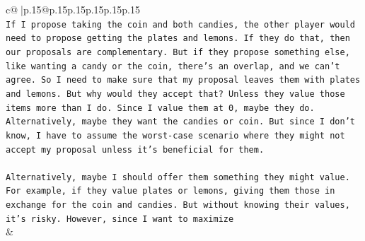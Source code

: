 \documentclass{article}
\begin{document}
{\begin{supertabular}{c@{$\;$}|p{.15\linewidth}@{}p{.15\linewidth}p{.15\linewidth}p{.15\linewidth}p{.15\linewidth}p{.15\linewidth}}
{{{\\ 
\texttt{If I propose taking the coin and both candies, the other player would need to propose getting the plates and lemons. If they do that, then our proposals are complementary. But if they propose something else, like wanting a candy or the coin, there's an overlap, and we can't agree. So I need to make sure that my proposal leaves them with plates and lemons. But why would they accept that? Unless they value those items more than I do. Since I value them at 0, maybe they do. Alternatively, maybe they want the candies or coin. But since I don't know, I have to assume the worst{-}case scenario where they might not accept my proposal unless it's beneficial for them.} \\
\\ 
\texttt{Alternatively, maybe I should offer them something they might value. For example, if they value plates or lemons, giving them those in exchange for the coin and candies. But without knowing their values, it's risky. However, since I want to maximize} \\
            }
        }
    }
    & \\ \\


\end{supertabular}}
\end{document}
